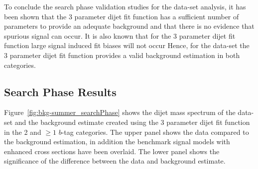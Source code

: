 \FloatBarrier

To conclude the search phase validation studies for the \summer{} data-set analysis,
it has been shown that the 3 parameter dijet fit function has a
sufficient number of parameters to provide an adequate background
and that there is no evidence that spurious signal can occur.
It is also known that for the 3 parameter dijet fit function large signal
induced fit biases will not occur
Hence, for the \summer{} data-set the 3 parameter dijet fit function
provides a valid background estimation in both categories.


\clearpage

\subsection{Search Phase Results}
\label{sec:bkg-summer_results}

Figure~\ref{fig:bkg-summer_searchPhase} shows the dijet mass spectrum of the
\summer{} data-set and the background estimate created using the 3 parameter dijet fit function
in the 2 and $\geq1$ $b$-tag categories.
The upper panel shows the data compared to the background estimation,
in addition the benchmark signal models with enhanced cross sections have been overlaid.
The lower panel shows the significance of the difference between the data and background estimate.

